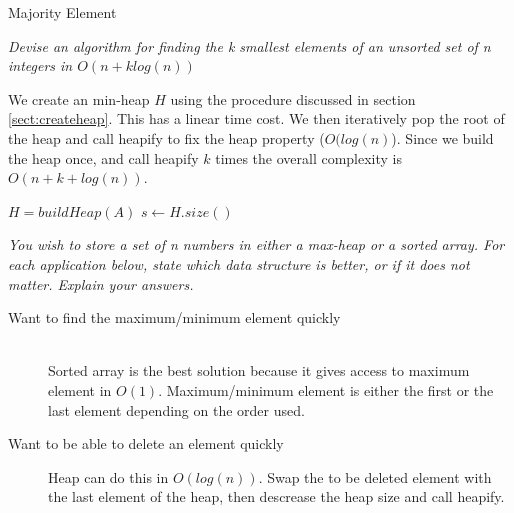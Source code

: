 \begin{problem}{Majority Element}
\begin{solution}
\end{solution}
\end{problem}




\begin{problem}
\textit{Devise an algorithm for finding the k smallest elements of an unsorted set of n
integers in $O(n + k log (n))$}

\begin{solution}
We create an min-heap $H$ using the procedure discussed in section \ref{sect:createheap}. This has a linear time cost. We then iteratively pop the root of the heap and call heapify to fix the heap property ($O(log(n)$). Since we build the heap once, and call heapify $k$ times the overall complexity is $O(n + k + log(n))$.\hfill \\
\begin{algorithm}
 $H = buildHeap(A)$\;
 $s \gets H.size()$\;
 
\;
\end{algorithm}



\end{solution}
\end{problem}




\begin{problem}
\textit{You wish to store a set of n numbers in either a max-heap or a sorted array.
For each application below, state which data structure is better, or if it does not
matter. Explain your answers.}

\begin{solution}

\begin{description}
\item [Want to find the maximum/minimum element quickly] \hfill \\ Sorted array is the best solution because it gives access to maximum element in $O(1)$. Maximum/minimum element is either the first or the last element depending on the order used.
\item [Want to be able to delete an element quickly] Heap can do this in $O(log(n))$. Swap the to be deleted element with the last element of the heap, then descrease the heap size and call heapify.
\end{description}

\end{solution}
\end{problem}


